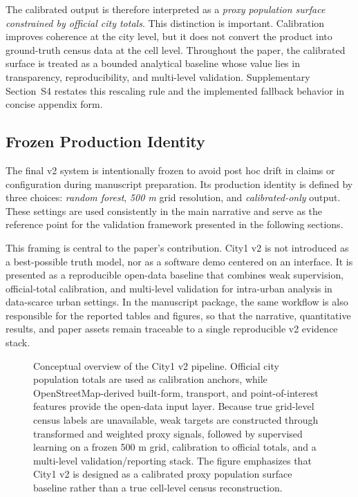 The calibrated output is therefore interpreted as a \emph{proxy population surface constrained by official city totals}. This distinction is important. Calibration improves coherence at the city level, but it does not convert the product into ground-truth census data at the cell level. Throughout the paper, the calibrated surface is treated as a bounded analytical baseline whose value lies in transparency, reproducibility, and multi-level validation. Supplementary Section~S4 restates this rescaling rule and the implemented fallback behavior in concise appendix form.

\subsection{Frozen Production Identity}

The final v2 system is intentionally frozen to avoid post hoc drift in claims or configuration during manuscript preparation. Its production identity is defined by three choices: \emph{random forest}, \emph{500 m} grid resolution, and \emph{calibrated-only} output. These settings are used consistently in the main narrative and serve as the reference point for the validation framework presented in the following sections.

This framing is central to the paper's contribution. City1 v2 is not introduced as a best-possible truth model, nor as a software demo centered on an interface. It is presented as a reproducible open-data baseline that combines weak supervision, official-total calibration, and multi-level validation for intra-urban analysis in data-scarce urban settings. In the manuscript package, the same workflow is also responsible for the reported tables and figures, so that the narrative, quantitative results, and paper assets remain traceable to a single reproducible v2 evidence stack.

\begin{figure}[H]
\centering

\caption{Conceptual overview of the City1 v2 pipeline. Official city population totals are used as calibration anchors, while OpenStreetMap-derived built-form, transport, and point-of-interest features provide the open-data input layer. Because true grid-level census labels are unavailable, weak targets are constructed through transformed and weighted proxy signals, followed by supervised learning on a frozen 500 m grid, calibration to official totals, and a multi-level validation/reporting stack. The figure emphasizes that City1 v2 is designed as a calibrated proxy population surface baseline rather than a true cell-level census reconstruction.}
\label{fig:pipeline}
\end{figure}
